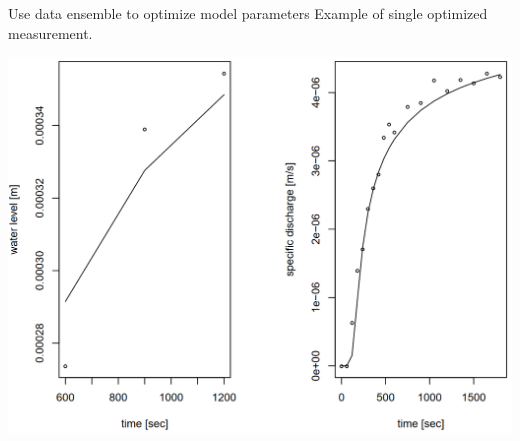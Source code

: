\begin{frame}{Use data ensemble to optimize model parameters}
   Example of single optimized measurement. 
   \begin{center}
   \includegraphics[width=0.6\paperwidth]{img/optim}
   \end{center}
\end{frame}





